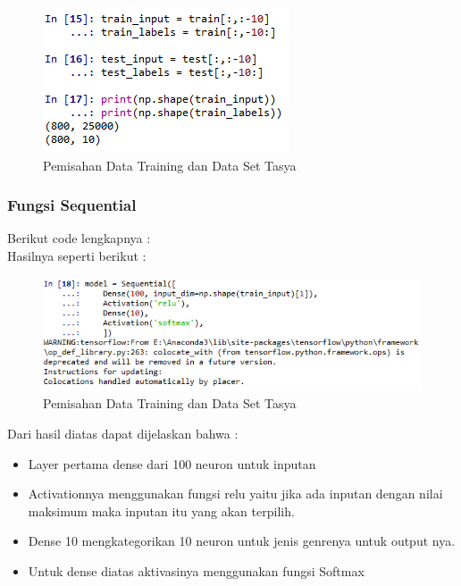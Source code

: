 \begin{enumerate}
\begin{itemize}
\begin{itemize}
\begin{figure}[ht]
\centering
\includegraphics[scale=0.5]{figures/chapter6tasya16.png}
\caption{Pemisahan Data Training dan Data Set Tasya}
\label{Praktek}
\end{figure}
\end{itemize}

\subsubsection{Fungsi Sequential}
Berikut code lengkapnya :\\

Hasilnya seperti berikut :\\
\begin{figure}[ht]
\centering
\includegraphics[scale=0.5]{figures/chapter6tasya17.png}
\caption{Pemisahan Data Training dan Data Set Tasya}
\label{Praktek}
\end{figure}
Dari hasil diatas dapat dijelaskan bahwa :\\
\begin{itemize}
\item Layer pertama dense dari 100 neuron untuk inputan
\item Activationnya menggunakan fungsi relu yaitu jika ada inputan dengan nilai maksimum maka inputan itu yang akan terpilih.
\item Dense 10 mengkategorikan 10 neuron untuk jenis genrenya untuk output nya.
\item Untuk dense diatas aktivasinya menggunakan fungsi Softmax
\end{itemize}


\end{itemize}
\end{enumerate}
